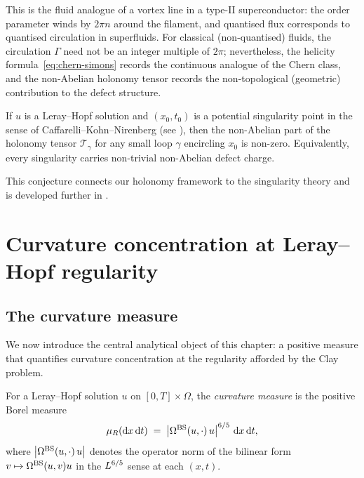 This is the fluid analogue of a vortex line in a type-II superconductor: the order
parameter winds by $2\pi n$ around the filament, and quantised flux corresponds to
quantised circulation in superfluids.  For classical (non-quantised) fluids, the
circulation $\Gamma$ need not be an integer multiple of $2\pi$; nevertheless, the
helicity formula~\eqref{eq:chern-simons} records the continuous analogue of the
Chern class, and the non-Abelian holonomy tensor records the non-topological
(geometric) contribution to the defect structure.

\begin{conjecture}\label{conj:defect-charge}
  If $u$ is a Leray--Hopf solution and $(x_0, t_0)$ is a potential singularity point
  in the sense of Caffarelli--Kohn--Nirenberg (see ), then the
  non-Abelian part of the holonomy tensor $\mathcal{T}_\gamma$ for any small loop
  $\gamma$ encircling $x_0$ is non-zero.  Equivalently, every singularity carries
  non-trivial non-Abelian defect charge.
\end{conjecture}

This conjecture connects our holonomy framework to the singularity theory and is
developed further in .

\section{Curvature concentration at Leray--Hopf regularity}\label{sec:curv-leray}

\subsection{The curvature measure}

We now introduce the central analytical object of this chapter: a positive measure
that quantifies curvature concentration at the regularity afforded by the Clay problem.

\begin{definition}\label{def:curvature-measure}
  For a Leray--Hopf solution $u$ on $[0,T] \times \Omega$, the
  \emph{curvature measure} is the positive Borel measure
  \begin{equation}\label{eq:curvature-measure}
    \mu_R(\mathrm{d} x\,\mathrm{d} t) \;=\; \left\lvert \Omega^{\mathrm{BS}}(u,\cdot)\,u \right\rvert^{6/5}\,\mathrm{d} x\,\mathrm{d} t,
  \end{equation}
  where $\left\lvert \Omega^{\mathrm{BS}}(u,\cdot)\,u \right\rvert$ denotes the operator norm of the bilinear form
  $v \mapsto \Omega^{\mathrm{BS}}(u,v)u$ in the $L^{6/5}$ sense at each $(x,t)$.
\end{definition}

